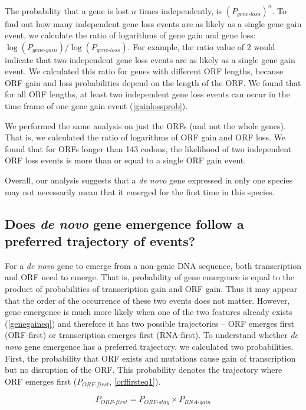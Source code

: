 \documentclass[12pt,a4paper]{article}
\begin{document}
The probability that a gene is lost $n$ times independently, is $(P_\textit{gene-loss})^{n}$. To find out how many independent gene loss events are as likely as a single gene gain event, we calculate the ratio of logarithms of gene gain and gene loss: $\log(P_\textit{gene-gain})/\log(P_\textit{gene-loss})$. For example, the ratio value of 2 would indicate that two independent gene loss events are as likely as a single gene gain event. We calculated this ratio for genes with different ORF lengths, because ORF gain and loss probabilities depend on the length of the ORF. We found that for all ORF lengths, at least two independent gene loss events can occur in the time frame of one gene gain event (\autoref{gainlossprob}). 

We performed the same analysis on just the ORFs (and not the whole genes). That is, we calculated the ratio of logarithms of ORF gain and ORF loss. We found that for ORFs longer than 143 codons, the likelihood of two independent ORF loss events is more than or equal to a single ORF gain event. 

Overall, our analysis suggests that a \textit{de novo} gene expressed in only one species may not necessarily mean that it emerged for the first time in this species. 

\subsection{Does \textit{de novo} gene emergence follow a preferred trajectory of events?}

For a \textit{de novo} gene to emerge from a non-genic DNA sequence, both transcription and ORF need to emerge. That is, probability of gene emergence is equal to the product of probabilities of transcription gain and ORF gain. Thus it may appear that the order of the occurrence of these two events does not matter. However, gene emergence is much more likely when one of the two features already exists (\autoref{genegaineq}) and therefore it has two possible trajectories -- ORF emerges first (ORF-first) or transcription emerges first (RNA-first). To understand whether \textit{de novo} gene emergence has a preferred trajectory, we calculated two probabilities. First, the probability that ORF exists and  mutations cause gain of transcription but no disruption of the ORF. This probability denotes the trajectory where ORF emerges first ($P_\textit{ORF-first}$, \autoref{orffirsteq1}). 

\begin{equation}
P_\textit{ORF-first} = P_\textit{ORF-stay}\times P_\textit{RNA-gain}
\label{orffirsteq1}
\end{equation}
\end{document}
